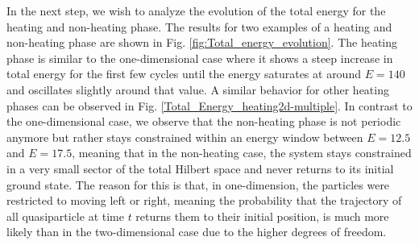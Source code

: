 \documentclass[11pt, a4paper, oneside]{book}
\theoremstyle{definition} %
\begin{document}
In the next step, we wish to analyze the evolution of the total energy for the heating and non-heating phase. The results for two examples of a heating and non-heating phase are shown in Fig. \ref{fig:Total_energy_evolution}. The heating phase is similar to the one-dimensional case  where it shows a steep increase in total energy for the first few cycles until the energy saturates at around $E =140$ and oscillates slightly around that value. A similar behavior for other heating phases can be observed in Fig. \ref{Total_Energy_heating2d-multiple}.  In contrast to the one-dimensional case, we observe that the non-heating phase is not periodic anymore but rather stays constrained within an energy window between $E = 12.5$ and $E=17.5$, meaning that in the non-heating case, the system stays constrained in a very small sector of the total Hilbert space and never returns to its initial ground state. The reason for this is that, in one-dimension, the particles were restricted to moving left or right, meaning the probability that the trajectory of all quasiparticle at time $t$ returns them to their initial position, is much more likely than in the two-dimensional case due to the higher degrees of freedom.
\end{document}
